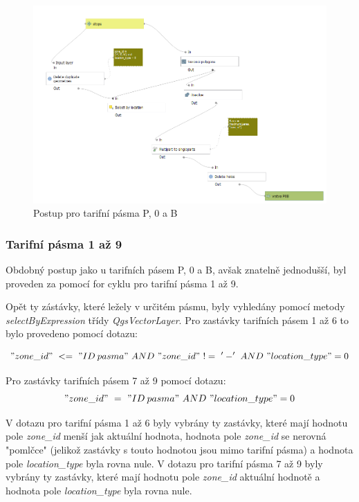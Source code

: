 \begin{figure}[H] \centering
    \includegraphics[width=400pt]{./pictures/postup-voronoi-P0B.png}
    \caption[Postup pro tarifní pásma P, 0 a B]{Postup pro tarifní pásma P, 0 a B}
	\label{fig:postup-voronoi-P0B}              
\end{figure}

\subsubsection{Tarifní pásma 1 až 9}
\label{tp_1az9}

Obdobný postup jako u tarifních pásem P, 0 a B, avšak znatelně jednodušší, byl proveden za pomocí
for cyklu pro tarifní pásma 1 až 9. 

Opět ty zástávky, které ležely v určitém pásmu, byly vyhledány pomocí metody \textit{selectByExpression} třídy 
\textit{QgsVectorLayer}. Pro zastávky tarifních pásem 1 až 6 to bylo provedeno pomocí dotazu:

\["zone\_id"\ <=\ "ID\: pasma"\ AND\ "zone\_id"\ !=\ '-'\ AND\ "location\_type" = 0\]  

Pro zastávky tarifních pásem 7 až 9 pomocí dotazu:
\["zone\_id"\ =\ "ID\: pasma"\ AND\ "location\_type" = 0\] 

V dotazu pro tarifní pásma 1 až 6 byly vybrány ty zastávky, které mají hodnotu pole \textit{zone\_id} menší jak aktuální hodnota,
hodnota pole \textit{zone\_id} se nerovná "pomlčce" (jelikož zastávky s touto hodnotou jsou mimo tarifní pásma)
a hodnota pole \textit{location\_type} byla rovna nule. V dotazu pro tarifní pásma 7 až 9 byly vybrány ty zastávky,
které mají hodnotu pole \textit{zone\_id} aktuální hodnotě a hodnota pole \textit{location\_type} byla rovna nule.

